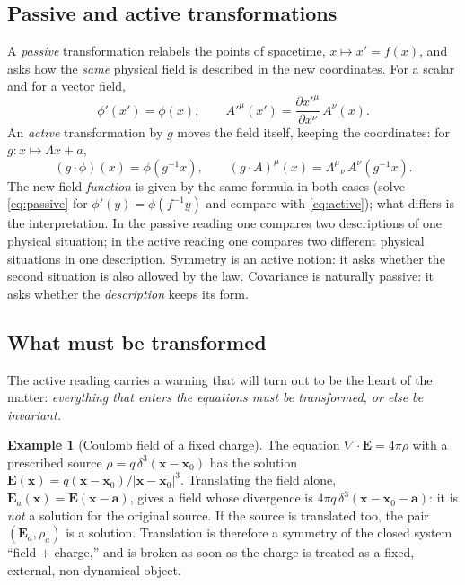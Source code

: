 \documentclass[11pt,a4paper,openany]{book}
\theoremstyle{definition}
\newtheorem{example}{Example}[chapter]
\theoremstyle{plain}
\theoremstyle{remark}
\newcommand{\vx}{\bm{x}}
\newcommand{\vE}{\bm{E}}
\begin{document}
\subsection{Passive and active transformations}

A \emph{passive} transformation relabels the points of spacetime,
$x\mapsto x'=f(x)$, and asks how the \emph{same} physical field is described
in the new coordinates. For a scalar and for a vector field,
\begin{equation}\label{eq:passive}
  \phi'(x') = \phi(x),\qquad
  A'^\mu(x') = \frac{\partial x'^\mu}{\partial x^\nu}\,A^\nu(x).
\end{equation}
An \emph{active} transformation by $g$ moves the field itself, keeping the
coordinates: for $g\colon x\mapsto \Lambda x + a$,
\begin{equation}\label{eq:active}
  (g\cdot\phi)(x) = \phi(g^{-1}x),\qquad
  (g\cdot A)^\mu(x) = \Lambda^\mu{}_\nu\,A^\nu(g^{-1}x).
\end{equation}
The new field \emph{function} is given by the same formula in both cases
(solve \eqref{eq:passive} for $\phi'(y)=\phi(f^{-1}y)$ and compare with
\eqref{eq:active}); what differs is the interpretation. In the passive
reading one compares two descriptions of one physical situation; in the
active reading one compares two different physical situations in one
description. Symmetry is an active notion: it asks whether the second
situation is also allowed by the law. Covariance is naturally passive: it asks
whether the \emph{description} keeps its form.

\subsection{What must be transformed}

The active reading carries a warning that will turn out to be the heart of
the matter: \emph{everything that enters the equations must be transformed,
or else be invariant.}

\begin{example}[Coulomb field of a fixed charge]\label{ex:coulomb}
The equation $\nabla\!\cdot\vE=4\pi\rho$ with a prescribed source
$\rho=q\,\delta^3(\vx-\vx_0)$ has the solution
$\vE(\vx)=q(\vx-\vx_0)/|\vx-\vx_0|^3$. Translating the field alone,
$\vE_a(\vx)=\vE(\vx-\bm a)$, gives a field whose divergence is
$4\pi q\,\delta^3(\vx-\vx_0-\bm a)$: it is \emph{not} a solution for the
original source. If the source is translated too, the pair
$(\vE_a,\rho_a)$ is a solution. Translation is therefore a symmetry of the
closed system ``field $+$ charge,'' and is broken as soon as the charge is
treated as a fixed, external, non-dynamical object.
\end{example}
\end{document}
